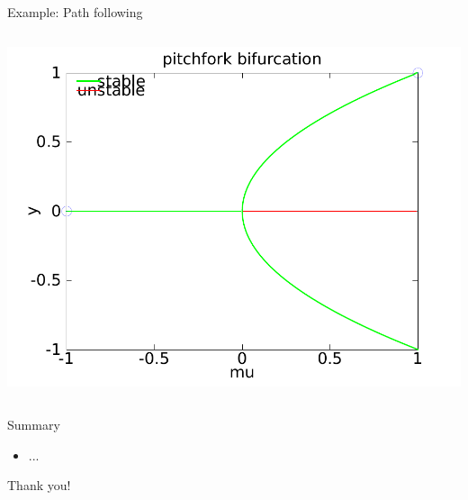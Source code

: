 \documentclass{beamer}
\begin{document}
\begin{frame}{Example: Path following}
\begin{columns}
        \pause
        
        \includegraphics[width=1\textwidth]{grafik/pfexample2}
        
    \end{columns}
\end{frame}

\begin{frame}{Summary}
    \begin{itemize}
        \item ...
    \end{itemize}
\end{frame}

\begin{frame}[plain]{Thank you!}
    
\end{frame}
\end{document}
